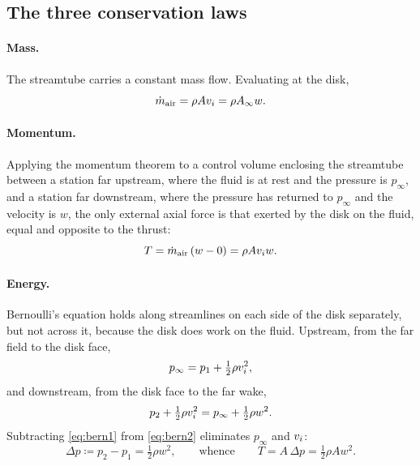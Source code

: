 \subsection{The three conservation laws}

\paragraph{Mass.} The streamtube carries a constant mass flow. Evaluating at
the disk,
\begin{equation}
  \dot m_{\mathrm{air}} = \rho A v_i = \rho A_\infty w .
  \label{eq:continuity}
\end{equation}

\paragraph{Momentum.} Applying the momentum theorem to a control volume
enclosing the streamtube between a station far upstream, where the fluid is at
rest and the pressure is $p_\infty$, and a station far downstream, where the
pressure has returned to $p_\infty$ and the velocity is $w$, the only external
axial force is that exerted by the disk on the fluid, equal and opposite to the
thrust:
\begin{equation}
  T = \dot m_{\mathrm{air}}\,(w - 0) = \rho A v_i w .
  \label{eq:momentum}
\end{equation}

\paragraph{Energy.} Bernoulli's equation holds along streamlines on each side
of the disk separately, but not across it, because the disk does work on the
fluid. Upstream, from the far field to the disk face,
\begin{equation}
  p_\infty = p_1 + \tfrac12 \rho v_i^2 ,
  \label{eq:bern1}
\end{equation}
and downstream, from the disk face to the far wake,
\begin{equation}
  p_2 + \tfrac12 \rho v_i^2 = p_\infty + \tfrac12 \rho w^2 .
  \label{eq:bern2}
\end{equation}
Subtracting \cref{eq:bern1} from \cref{eq:bern2} eliminates $p_\infty$ and
$v_i$:
\begin{equation}
  \Delta p \coloneqq p_2 - p_1 = \tfrac12 \rho w^2 ,
  \qquad\text{whence}\qquad
  T = A\,\Delta p = \tfrac12 \rho A w^2 .
  \label{eq:pressurejump}
\end{equation}

